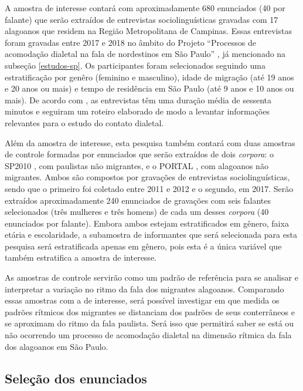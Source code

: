 \documentclass[
		a4paper,	%
		12pt,		%
		]{article}	%
\begin{document}
	A amostra de interesse contará com aproximadamente 680 enunciados (40 por
	falante) que serão extraídos de entrevistas sociolinguísticas gravadas com
	17 alagoanos que residem na Região Metropolitana de Campinas. Essas
	entrevistas foram gravadas entre 2017 e 2018 no âmbito do Projeto
	\enquote{Processos de acomodação dialetal na fala de nordestinos em São
	Paulo} \citep{Oushiro2018}, já mencionado na subseção \ref{estudos-sp}.
	Os participantes foram selecionados seguindo uma estratificação por genêro
	(feminino e masculino), idade de migração (até 19 anos e 20 anos ou mais) e
	tempo de residência em São Paulo (até 9 anos e 10 anos ou mais). De acordo
	com \citet{Oushiro2018}, as entrevistas têm uma duração média de sessenta
	minutos e seguiram um roteiro elaborado de modo a levantar informações
	relevantes para o estudo do contato dialetal.

	Além da amostra de interesse, esta pesquisa também contará com duas amostras
	de controle formadas por enunciados que serão extraídos de dois
	\emph{corpora}: o SP2010 \citep{Mendes.Oushiro2012}, com paulistas não
	migrantes, e o PORTAL \citep{Oliveira2017}, com alagoanos não migrantes.
	Ambos são compostos por gravações de entrevistas sociolinguísticas, sendo
	que o primeiro foi coletado entre 2011 e 2012 e o segundo, em 2017. Serão
	extraídos aproximadamente 240 enunciados de gravações com seis falantes
	selecionados (três mulheres e três homens) de cada um desses \emph{corpora}
	(40 enunciados por falante). Embora ambos estejam estratificados em gênero,
	faixa etária e escolaridade, a subamostra de informantes que será
	selecionada para esta pesquisa será estratificada apenas em gênero, pois
	esta é a única variável que também estratifica a amostra de interesse.

	As amostras de controle servirão como um padrão de referência para se
	analisar e interpretar a variação no ritmo da fala dos migrantes alagoanos.
	Comparando essas amostras com a de interesse, será possível investigar em
	que medida os padrões rítmicos dos migrantes se distanciam dos padrões de
	seus conterrâneos e se aproximam do ritmo da fala paulista. Será isso que
	permitirá saber se está ou não ocorrendo um processo de acomodação dialetal
	na dimensão rítmica da fala dos alagoanos em São Paulo.
		
	\subsection{Seleção dos enunciados} \label{selecao}
\end{document}
